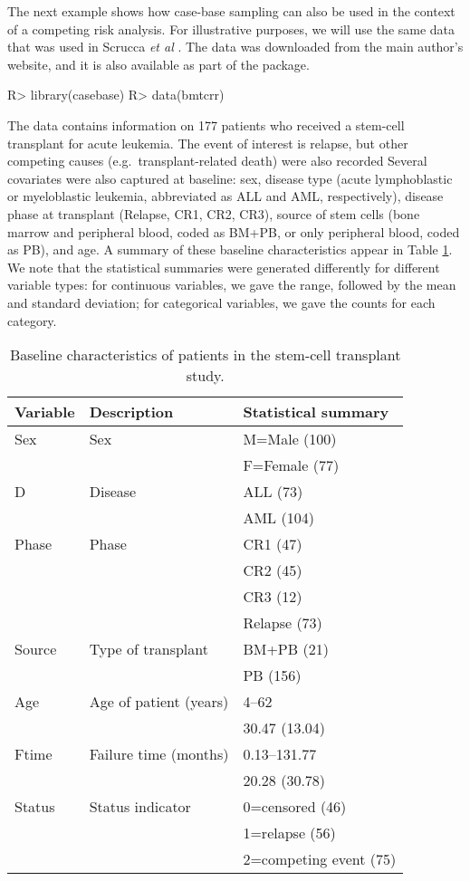 \documentclass[article]{jss}
\begin{document}
The next example shows how case-base sampling can also be used in the
context of a competing risk analysis. For illustrative purposes, we will
use the same data that was used in Scrucca \emph{et al}
\citeyearpar{scrucca2010regression}. The data was downloaded from the
main author's website, and it is also available as part of the
 package.

\begin{CodeChunk}

\begin{CodeInput}
R> library(casebase)
R> data(bmtcrr)
\end{CodeInput}
\end{CodeChunk}

The data contains information on 177 patients who received a stem-cell
transplant for acute leukemia. The event of interest is relapse, but
other competing causes (e.g.~transplant-related death) were also
recorded Several covariates were also captured at baseline: sex, disease
type (acute lymphoblastic or myeloblastic leukemia, abbreviated as ALL
and AML, respectively), disease phase at transplant (Relapse, CR1, CR2,
CR3), source of stem cells (bone marrow and peripheral blood, coded as
BM+PB, or only peripheral blood, coded as PB), and age. A summary of
these baseline characteristics appear in Table \ref{tab:table1bmtcrr}.
We note that the statistical summaries were generated differently for
different variable types: for continuous variables, we gave the range,
followed by the mean and standard deviation; for categorical variables,
we gave the counts for each category.

\begin{table}[ht]
\centering
\begin{tabular}{lll}
  \hline
Variable & Description & Statistical summary \\ 
  \hline
Sex & Sex & M=Male (100) \\ 
   &  & F=Female (77) \\ 
  D & Disease & ALL (73) \\ 
   &  & AML (104) \\ 
  Phase & Phase & CR1 (47) \\ 
   &  & CR2 (45) \\ 
   &  & CR3 (12) \\ 
   &  & Relapse (73) \\ 
  Source & Type of transplant & BM+PB (21) \\ 
   &  & PB (156) \\ 
  Age & Age of patient (years) & 4–62 \\ 
   &  & 30.47 (13.04) \\ 
  Ftime & Failure time (months) & 0.13–131.77 \\ 
   &  & 20.28 (30.78) \\ 
  Status & Status indicator & 0=censored (46) \\ 
   &  & 1=relapse (56) \\ 
   &  & 2=competing event (75) \\ 
   \hline
\end{tabular}
\caption{Baseline characteristics of patients in the stem-cell transplant study.}
\label{tab:table1bmtcrr}
\end{table}
\end{document}
